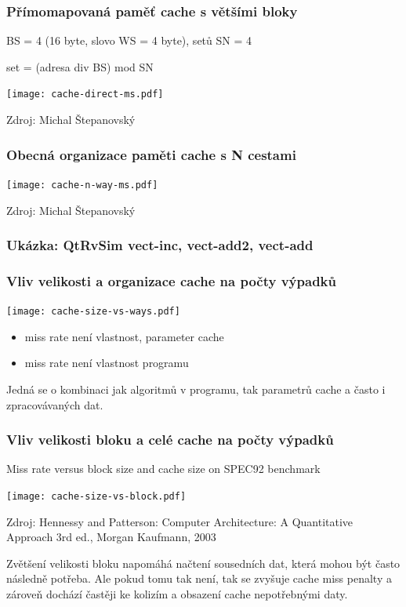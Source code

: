 \documentclass{beamer}
\begin{document}
\begin{frame}
\frametitle{Přímomapovaná paměť cache s většími bloky}

BS = 4 (16 byte, slovo WS = 4 byte), setů SN = 4

set = (adresa div BS) mod SN

{
\centering

\texttt{[image: cache-direct-ms.pdf]}

}

{\tiny Zdroj: Michal Štepanovský}
\end{frame}

\begin{frame}
\frametitle{Obecná organizace paměti cache s N cestami}

{
\centering

\texttt{[image: cache-n-way-ms.pdf]}

}

{\tiny Zdroj: Michal Štepanovský}

\end{frame}

\begin{frame}
\frametitle{Ukázka: QtRvSim vect-inc, vect-add2, vect-add}

\end{frame}

\begin{frame}
\frametitle{Vliv velikosti a organizace cache na počty výpadků}

{
\centering

\texttt{[image: cache-size-vs-ways.pdf]}

}

\begin{itemize}
\item miss rate není vlastnost, parameter cache
\item miss rate není vlastnost programu
\end{itemize}

Jedná se o kombinaci jak algoritmů v programu, tak parametrů cache a často i zpracovávaných dat.

\end{frame}

\begin{frame}
\frametitle{Vliv velikosti bloku a celé cache na počty výpadků}

Miss rate versus block size and cache size on SPEC92 benchmark

\vskip 2mm

{
\centering

\texttt{[image: cache-size-vs-block.pdf]}

}

\vskip 2mm

{\tiny Zdroj: Hennessy and Patterson: Computer Architecture: A Quantitative Approach 3rd ed., Morgan Kaufmann, 2003}

Zvětšení velikosti bloku napomáhá načtení sousedních dat, která mohou být často následně potřeba.
Ale pokud tomu tak není, tak se zvyšuje cache miss penalty a zároveň dochází častěji ke kolizím
a obsazení cache nepotřebnými daty.

\end{frame}
\end{document}
